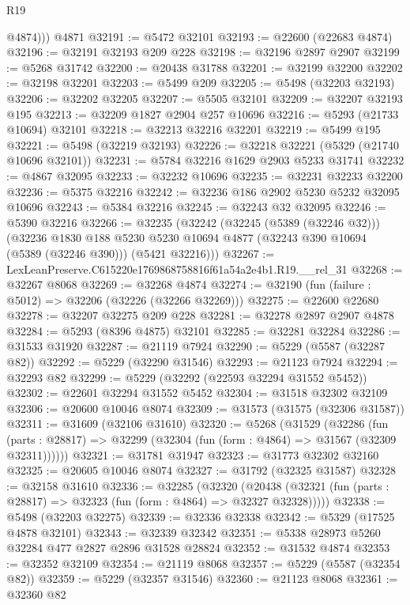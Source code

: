 \begin{lexlean}{R19}
\begin{coremodule}
          @4874)))
    @4871
@32191 := @5472 @32101
@32193 := @22600 (@22683 @4874)
@32196 := @32191 @32193 @209 @228
@32198 := @32196 @2897 @2907
@32199 := @5268 @31742
@32200 := @20438 @31788
@32201 := @32199 @32200
@32202 := @32198 @32201
@32203 := @5499 @209
@32205 := @5498 (@32203 @32193)
@32206 := @32202 @32205
@32207 := @5505 @32101
@32209 := @32207 @32193 @195
@32213 := @32209 @1827 @2904 @257 @10696
@32216 := @5293 (@21733 @10694) @32101
@32218 := @32213 @32216 @32201
@32219 := @5499 @195
@32221 := @5498 (@32219 @32193)
@32226 := @32218 @32221 (@5329 (@21740 @10696 @32101))
@32231 := @5784 @32216 @1629 @2903 @5233 @31741
@32232 := @4867 @32095
@32233 := @32232 @10696
@32235 := @32231 @32233 @32200
@32236 := @5375 @32216
@32242 := @32236 @186 @2902 @5230 @5232 @32095 @10696
@32243 := @5384 @32216
@32245 := @32243 @32 @32095
@32246 := @5390 @32216
@32266 := @32235
    (@32242
      (@32245 (@5389 (@32246 @32)))
      (@32236
        @1830
        @188
        @5230
        @5230
        @10694
        @4877
        (@32243 @390 @10694 (@5389 (@32246 @390)))
        (@5421 @32216)))
@32267 := LexLeanPreserve.C615220e1769868758816f61a54a2e4b1.R19.__rel_31
@32268 := @32267 @8068
@32269 := @32268 @4874
@32274 := @32190 (fun (failure : @5012) => @32206 (@32226 (@32266 @32269)))
@32275 := @22600 @22680
@32278 := @32207 @32275 @209 @228
@32281 := @32278 @2897 @2907 @4878
@32284 := @5293 (@8396 @4875) @32101
@32285 := @32281 @32284
@32286 := @31533 @31920
@32287 := @21119 @7924
@32290 := @5229 (@5587 (@32287 @82))
@32292 := @5229 (@32290 @31546)
@32293 := @21123 @7924
@32294 := @32293 @82
@32299 := @5229 (@32292 (@22593 @32294 @31552 @5452))
@32302 := @22601 @32294 @31552 @5452
@32304 := @31518 @32302 @32109
@32306 := @20600 @10046 @8074
@32309 := @31573 (@31575 (@32306 @31587))
@32311 := @31609 (@32106 @31610)
@32320 := @5268
    (@31529
      (@32286
        (fun (parts : @28817) => @32299 (@32304 (fun (form : @4864) => @31567 (@32309 @32311))))))
@32321 := @31781 @31947
@32323 := @31773 @32302 @32160
@32325 := @20605 @10046 @8074
@32327 := @31792 (@32325 @31587)
@32328 := @32158 @31610
@32336 := @32285
    (@32320
      (@20438 (@32321 (fun (parts : @28817) => @32323 (fun (form : @4864) => @32327 @32328)))))
@32338 := @5498 (@32203 @32275)
@32339 := @32336 @32338
@32342 := @5329 (@17525 @4878 @32101)
@32343 := @32339 @32342
@32351 := @5338 @28973 @5260 @32284 @477 @2827 @2896 @31528 @28824
@32352 := @31532 @4874
@32353 := @32352 @32109
@32354 := @21119 @8068
@32357 := @5229 (@5587 (@32354 @82))
@32359 := @5229 (@32357 @31546)
@32360 := @21123 @8068
@32361 := @32360 @82

\end{coremodule}
\end{lexlean}
